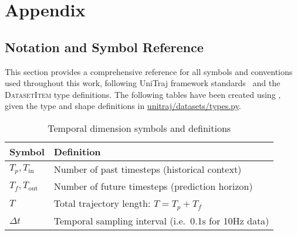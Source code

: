 \appendix
\section{Appendix}

\subsection{Notation and Symbol Reference}
\label{app:notation}

This section provides a comprehensive reference for all symbols and conventions used throughout this work, following UniTraj framework standards~\cite{unitrajFeng2024} and the \textsc{DatasetItem} type definitions. The following tables have been created using \cite{copilotSonnet}, given the type and shape definitions in \href{https://github.com/JanDuchscherer104/UniTraj/blob/main/unitraj/datasets/types.py}{unitraj/datasets/types.py}.

\begin{table}[H]
\caption{Temporal dimension symbols and definitions}
\centering
\begin{tabular}{p{3cm}p{10cm}}
\toprule
\textbf{Symbol} & \textbf{Definition} \\
\midrule
\(T_p, T_{\text{in}}\) & Number of past timesteps (historical context) \\
\(T_f, T_{\text{out}}\) & Number of future timesteps (prediction horizon) \\
\(T\) & Total trajectory length: \(T = T_p + T_f\) \\
\(\Delta t\) & Temporal sampling interval (i.e.\ 0.1s for 10Hz data) \\
\bottomrule
\end{tabular}
\end{table}

